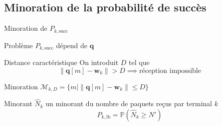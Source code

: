\subsection{Minoration de la probabilité de succès}
\begin{frame}{Minoration de \( P_{k, \text{succ}} \)}
  \begin{alertblock}{Problème}
    \( P_{k, \text{succ}} \) dépend de \( \mathbf{q} \)
  \end{alertblock}
  \begin{block}{Distance caractéristique}
    On introduit \( D \) tel que
    \[ \| \mathbf{q}[m] - \mathbf{w}_{k} \| > D \implies
      \text{réception impossible} \]
  \end{block}
\end{frame}
\begin{frame}{Minoration}
  \( \mathcal{M}_{k, D} = \{ m | \| \mathbf{q}[m] - \mathbf{w}_k \|
  \leq D \} \)
  \begin{block}{Minorant}
    \( \hat{N}_k \) un minorant du nombre de paquets reçus par
    terminal \( k \)
    \begin{equation}
      P_{k, \text{lb}} = \mathbb{P}(\hat{N}_k \geq N')
    \end{equation}
  \end{block}
\end{frame}

